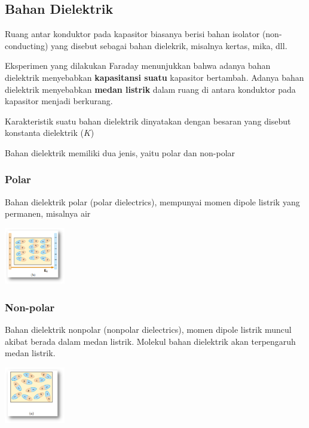 \documentclass[twocolumn, 11pt]{article}%
\begin{document}
    \subsection{Bahan Dielektrik}%
    Ruang antar konduktor pada kapasitor biasanya berisi bahan isolator (non-conducting) yang disebut sebagai bahan dielekrik, misalnya kertas, mika, dll.

    Eksperimen yang dilakukan Faraday menunjukkan bahwa adanya bahan dielektrik menyebabkan \textbf{kapasitansi suatu} kapasitor bertambah. Adanya bahan dielektrik menyebabkan \textbf{medan listrik} dalam ruang di antara konduktor pada kapasitor menjadi berkurang.

    Karakteristik suatu bahan dielektrik dinyatakan dengan besaran yang disebut konstanta dielektrik ($K$)

    Bahan dielektrik memiliki dua jenis, yaitu polar dan non-polar

    \subsubsection{Polar}%
    Bahan dielektrik polar (polar dielectrics), mempunyai momen dipole listrik yang permanen, misalnya air
    \begin{center}
        \includegraphics[width=100px]{11.png}
    \end{center}

    \subsubsection{Non-polar}%
    Bahan dielektrik nonpolar (nonpolar dielectrics), momen dipole listrik muncul akibat berada dalam medan listrik. Molekul bahan dielektrik akan terpengaruh medan listrik.
    \begin{center}
        \includegraphics[width=100px]{12.png}
    \end{center}
    
\end{document}
